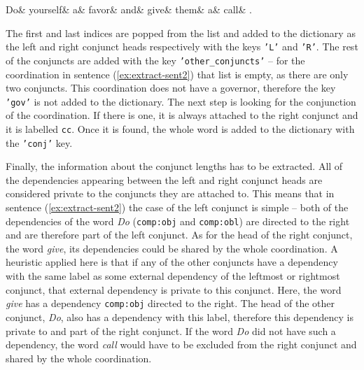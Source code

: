 \begin{exe}
\ex\label{ex:extract-sent2}
\begin{dependency}
	\begin{deptext}
		 Do\& yourself\& a\& favor\& and\& give\& them\& a\& call\& .\\
	 \end{deptext} 
\end{dependency}
\end{exe}

The first and last indices are popped from the list and added to the dictionary as the left and right conjunct heads respectively with the keys \texttt{'L'} and \texttt{'R'}. The rest of the conjuncts are added with the key \texttt{'other\_conjuncts'} -- for the coordination in sentence (\ref{ex:extract-sent2}) that list is empty, as there are only two conjuncts. This coordination does not have a governor, therefore the key \texttt{'gov'} is not added to the dictionary. The next step is looking for the conjunction of the coordination. If there is one, it is always attached to the right conjunct and it is labelled \texttt{cc}. Once it is found, the whole word is added to the dictionary with the \texttt{'conj'} key. 

Finally, the information about the conjunct lengths has to be extracted. All of the dependencies appearing between the left and right conjunct heads are considered private to the conjuncts they are attached to. This means that in sentence (\ref{ex:extract-sent2}) the case of the left conjunct is simple -- both of the dependencies of the word \textsl{Do} (\texttt{comp:obj} and \texttt{comp:obl}) are directed to the right and are therefore part of the left conjunct. As for the head of the right conjunct, the word \textsl{give}, its dependencies could be shared by the whole coordination. A heuristic applied here is that if any of the other conjuncts have a dependency with the same label as some external dependency of the leftmost or rightmost conjunct, that external dependency is private to this conjunct. Here, the word \textsl{give} has a dependency \texttt{comp:obj} directed to the right. The head of the other conjunct, \textsl{Do}, also has a dependency with this label, therefore this dependency is private to and part of the right conjunct. If the word \textsl{Do} did not have such a dependency, the word \textsl{call} would have to be excluded from the right conjunct and shared by the whole coordination. 

